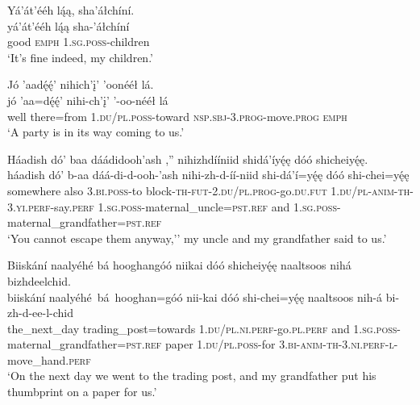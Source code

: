 \newpage
\ea\label{ex:text1-15-2}
Yá’át’ééh lą́ą, sha’áłchíní.\\
\gll yá’át’ééh	lą́ą	sha-’áłchíní\\
     good	\textsc{emph}	1.\textsc{sg}.\textsc{poss}-children\\
\glt `It's fine indeed, my children.'
\z

\ea\label{ex:text1-15-3}
Jó ’aadę́ę́’ nihich’į’ ’oonééł lá.\\
\gll jó	’aa=dę́ę́’	nihi-ch’į’	’-oo-nééł	lá\\
     well	there=from	1.\textsc{du}/\textsc{pl}.\textsc{poss}-toward	\textsc{nsp}.\textsc{sbj}-3.\textsc{prog}-move.\textsc{prog}	\textsc{emph}\\
\glt `A party is in its way coming to us.'
\z

\ea\label{ex:text1-15-4}
Háadish dó’ baa dáádidooh’ash ,'' nihizhdííniid shidá’íyę́ę dóó shicheiyę́ę.\\
\gll háadish	dó’	b-aa	dáá-di-d-ooh-’ash	nihi-zh-d-íí-niid	shi-dá’í=yę́ę	dóó	shi-chei=yę́ę\\
     somewhere	also	3.\textsc{bi}.\textsc{poss}-to	block-\textsc{th}-\textsc{fut}-2.\textsc{du}/\textsc{pl}.\textsc{prog}-go.\textsc{du}.\textsc{fut}	1.\textsc{du}/\textsc{pl}-\textsc{anim}-\textsc{th}-3.\textsc{yi}.\textsc{perf}-say.\textsc{perf}	1.\textsc{sg}.\textsc{poss}-maternal\_uncle=\textsc{pst}.\textsc{ref}	and	1.\textsc{sg}.\textsc{poss}-maternal\_grandfather=\textsc{pst}.\textsc{ref}\\
\glt `You cannot escape them anyway,'' my uncle and my grandfather said to us.'
\z

\ea\label{ex:text1-16-1}
Biiskání naalyéhé bá hooghangóó niikai dóó shicheiyę́ę naaltsoos nihá bizhdeelchid.\\
\gll biiskání	naalyéhé~bá~{hooghan=góó}	nii-kai	dóó	shi-chei=yę́ę	naaltsoos	nih-á	bi-zh-d-ee-l-chid\\
     the\_next\_day	trading\_post=towards	1.\textsc{du}/\textsc{pl}.\textsc{ni}.\textsc{perf}-go.\textsc{pl}.\textsc{perf}	and	1.\textsc{sg}.\textsc{poss}-maternal\_grandfather=\textsc{pst}.\textsc{ref}	paper	1.\textsc{du}/\textsc{pl}.\textsc{poss}-for	3.\textsc{bi}-\textsc{anim}-\textsc{th}-3.\textsc{ni}.\textsc{perf}-\textsc{l}-move\_hand.\textsc{perf}\\
\glt `On the next day we went to the trading post, and my grandfather put his thumbprint on a paper for us.'
\z

